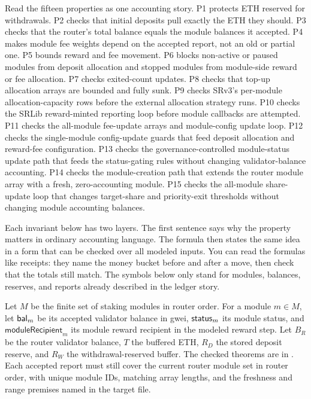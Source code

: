 \noindent Read the fifteen properties as one accounting story. P1 protects ETH
reserved for withdrawals. P2 checks that initial deposits pull exactly the ETH
they should. P3 checks that the router's total balance equals the module balances
it accepted. P4 makes module fee weights depend on the accepted report, not an
old or partial one. P5 bounds reward and fee movement. P6 blocks non-active or
paused modules from deposit allocation and stopped modules from module-side
reward or fee allocation. P7 checks exited-count updates. P8 checks that top-up
allocation arrays are bounded and fully sunk. P9 checks SRv3's per-module
allocation-capacity rows before the external allocation strategy runs. P10 checks
the SRLib reward-minted reporting loop before module callbacks are attempted.
P11 checks the all-module fee-update arrays and module-config update loop.
P12 checks the single-module config-update guards that feed deposit allocation
and reward-fee configuration. P13 checks the governance-controlled module-status
update path that feeds the status-gating rules without changing validator-balance
accounting. P14 checks the module-creation path that extends the router module
array with a fresh, zero-accounting module. P15 checks the all-module
share-update loop that changes target-share and priority-exit thresholds without
changing module accounting balances.

\smallskip
\noindent Each invariant below has two layers. The first sentence says why the
property matters in ordinary accounting language. The formula then states the
same idea in a form that can be checked over all modeled inputs. You can read
the formulas like receipts: they name the money bucket before and after a move,
then check that the totals still match. The symbols below only stand for modules,
balances, reserves, and reports already described in the ledger story.

\smallskip
\noindent Let \(M\) be the finite set of staking modules in router order. For a
module \(m \in M\), let \(\mathsf{bal}_m\) be its accepted validator balance in gwei,
\(\mathsf{status}_m\) its module status, and \(\mathsf{moduleRecipient}_m\) its module
reward recipient in the modeled reward step. Let \(B_R\) be the router validator balance, \(T\) the buffered ETH,
\(R_D\) the stored deposit reserve, and \(R_W\) the withdrawal-reserved buffer.
The checked theorems are in . Each accepted report must still cover the
current router module set in router order, with unique module IDs, matching array
lengths, and the freshness and range premises named in the target file.

